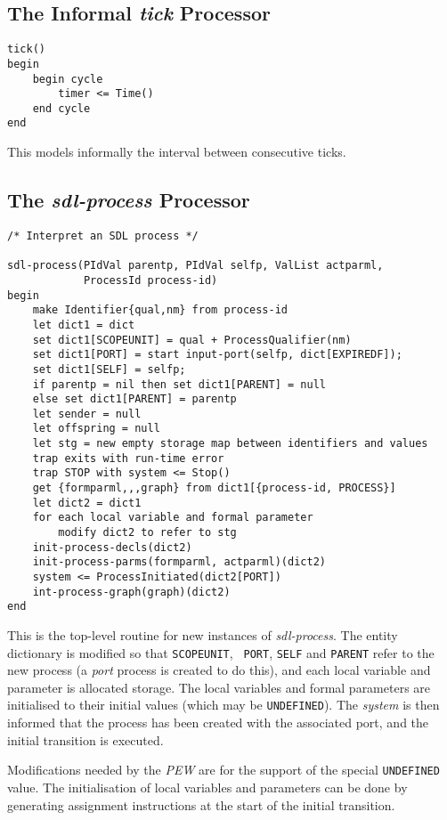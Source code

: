 \subsection{The Informal {\em tick} Processor}

\begin{verbatim}
tick()
begin
    begin cycle
        timer <= Time()
    end cycle
end
\end{verbatim}

This models informally the interval between consecutive ticks.

\subsection{The {\em sdl-process} Processor}

\begin{verbatim}
/* Interpret an SDL process */

sdl-process(PIdVal parentp, PIdVal selfp, ValList actparml, 
            ProcessId process-id)
begin
    make Identifier{qual,nm} from process-id
    let dict1 = dict
    set dict1[SCOPEUNIT] = qual + ProcessQualifier(nm)
    set dict1[PORT] = start input-port(selfp, dict[EXPIREDF]);
    set dict1[SELF] = selfp;
    if parentp = nil then set dict1[PARENT] = null
    else set dict1[PARENT] = parentp
    let sender = null
    let offspring = null
    let stg = new empty storage map between identifiers and values
    trap exits with run-time error
    trap STOP with system <= Stop()
    get {formparml,,,graph} from dict1[{process-id, PROCESS}]
    let dict2 = dict1
    for each local variable and formal parameter
        modify dict2 to refer to stg
    init-process-decls(dict2)
    init-process-parms(formparml, actparml)(dict2)
    system <= ProcessInitiated(dict2[PORT])
    int-process-graph(graph)(dict2)
end
\end{verbatim}

This is the top-level routine for new instances of {\em sdl-process}.
The entity dictionary is modified so that {\tt SCOPEUNIT}, {\tt
PORT}, {\tt SELF} and {\tt PARENT} refer to the new process 
(a {\em port} process is created to do this), and each
local variable and parameter is allocated storage. 
The local variables and formal parameters are initialised to their initial values
(which may be {\tt UNDEFINED}). 
The {\em system} is then informed
that the process has been created with the associated port, 
and the initial transition is executed.

Modifications needed by the {\em PEW} are for the support of the
special {\tt UNDEFINED} value. The initialisation of local variables
and parameters can be done by generating assignment instructions
at the start of the initial transition.

